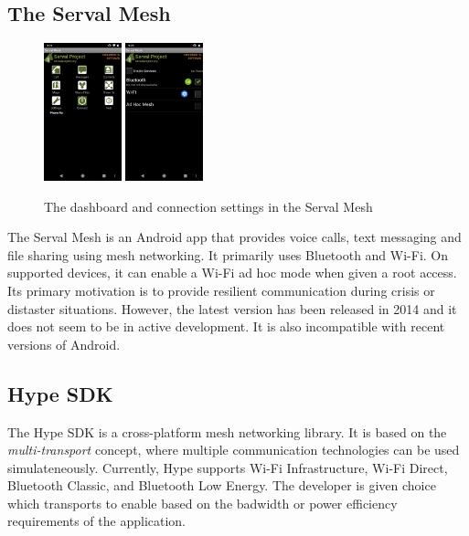 \documentclass[conference,compsoc]{IEEEtran}
\begin{document}
\subsection{The Serval Mesh}

\begin{figure}
  \centering
  \includegraphics[width=0.2\textwidth]{serval1} \includegraphics[width=0.2\textwidth]{serval2}
  \caption{The dashboard and connection settings in the Serval Mesh}
\end{figure}

The Serval Mesh \cite{serval} is an Android app that provides voice calls, text messaging and file sharing using mesh networking. It primarily uses Bluetooth and Wi-Fi. On supported devices, it can enable a Wi-Fi ad hoc mode when given a root access. Its primary motivation is to provide resilient communication during crisis or distaster situations. However, the latest version has been released in 2014 and it does not seem to be in active development. It is also incompatible with recent versions of Android.

\subsection{Hype SDK}
The Hype SDK \cite{hype} is a cross-platform mesh networking library. It is based on the \textit{multi-transport} concept, where multiple communication technologies can be used simulateneously. Currently, Hype supports Wi-Fi Infrastructure, Wi-Fi Direct, Bluetooth Classic, and Bluetooth Low Energy. The developer is given choice which transports to enable based on the badwidth or power efficiency requirements of the application.
\end{document}

